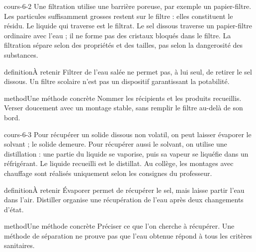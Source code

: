 \documentclass[12pt,twoside,openany]{book}
\begin{document}
\label{ch-6-cours-2}
\begin{pcFiche}{cours-6-2}
Une filtration utilise une barrière poreuse, par exemple un papier-filtre. Les particules suffisamment grosses restent sur le filtre : elles constituent le résidu. Le liquide qui traverse est le filtrat. Le sel dissous traverse un papier-filtre ordinaire avec l’eau ; il ne forme pas des cristaux bloqués dans le filtre. La filtration sépare selon des propriétés et des tailles, pas selon la dangerosité des substances.\par
{}
\begin{pcEncadre}{definition}{À retenir}
Filtrer de l’eau salée ne permet pas, à lui seul, de retirer le sel dissous. Un filtre scolaire n’est pas un dispositif garantissant la potabilité.\par
\end{pcEncadre}
\begin{pcEncadre}{method}{Une méthode concrète}
Nommer les récipients et les produits recueillis. Verser doucement avec un montage stable, sans remplir le filtre au-delà de son bord.\par
\end{pcEncadre}
\end{pcFiche}
\label{ch-6-cours-3}
\begin{pcFiche}{cours-6-3}
Pour récupérer un solide dissous non volatil, on peut laisser évaporer le solvant ; le solide demeure. Pour récupérer aussi le solvant, on utilise une distillation : une partie du liquide se vaporise, puis sa vapeur se liquéfie dans un réfrigérant. Le liquide recueilli est le distillat. Au collège, les montages avec chauffage sont réalisés uniquement selon les consignes du professeur.\par
{}
\begin{pcEncadre}{definition}{À retenir}
Évaporer permet de récupérer le sel, mais laisse partir l’eau dans l’air. Distiller organise une récupération de l’eau après deux changements d’état.\par
\end{pcEncadre}
\begin{pcEncadre}{method}{Une méthode concrète}
Préciser ce que l’on cherche à récupérer. Une méthode de séparation ne prouve pas que l’eau obtenue répond à tous les critères sanitaires.\par
\end{pcEncadre}
\end{pcFiche}
\end{document}
